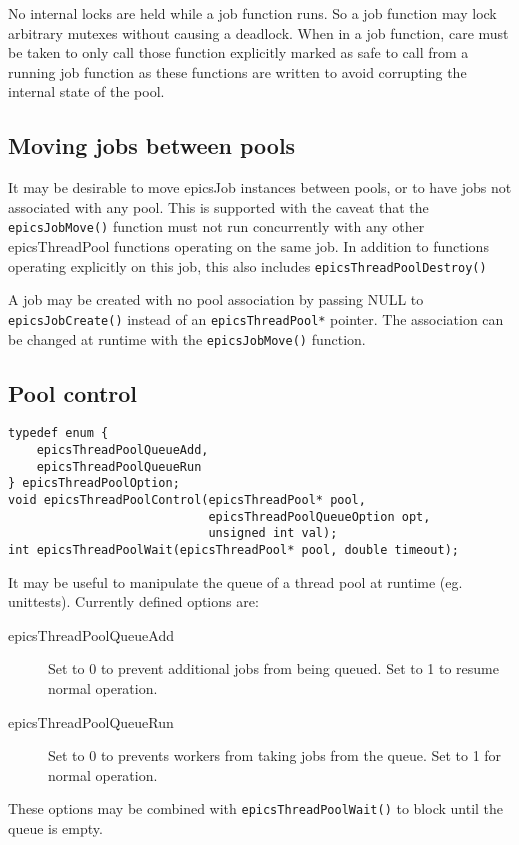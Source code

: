No internal locks are held while a job function runs.
So a job function may lock arbitrary mutexes without causing a deadlock.
When in a job function, care must be taken to only call those function explicitly
marked as safe to call from a running job function as these functions
are written to avoid corrupting the internal state of the pool.


\subsection{Moving jobs between pools}

It may be desirable to move epicsJob instances between pools, or to
have jobs not associated with any pool. This is supported with the
caveat that the \verb|epicsJobMove()| function must not run concurrently
with any other epicsThreadPool functions operating on the same job.
In addition to functions operating explicitly on this job, this also includes
\verb|epicsThreadPoolDestroy()|

A job may be created with no pool association by passing NULL to \verb|epicsJobCreate()|
instead of an \verb|epicsThreadPool*| pointer. The association can be changed
at runtime with the \verb|epicsJobMove()| function.


\subsection{Pool control}

\begin{verbatim}
typedef enum {
    epicsThreadPoolQueueAdd,
    epicsThreadPoolQueueRun
} epicsThreadPoolOption;
void epicsThreadPoolControl(epicsThreadPool* pool,
                            epicsThreadPoolQueueOption opt,
                            unsigned int val);
int epicsThreadPoolWait(epicsThreadPool* pool, double timeout);
\end{verbatim}



It may be useful to manipulate the queue of a thread pool at runtime
(eg. unittests). Currently defined options are:
\begin{description}
\item [{epicsThreadPoolQueueAdd}] Set to 0 to prevent additional jobs from
being queued. Set to 1 to resume normal operation.
\item [{epicsThreadPoolQueueRun}] Set to 0 to prevents workers from taking
jobs from the queue. Set to 1 for normal operation.
\end{description}
These options may be combined with \verb|epicsThreadPoolWait()| to block
until the queue is empty.

